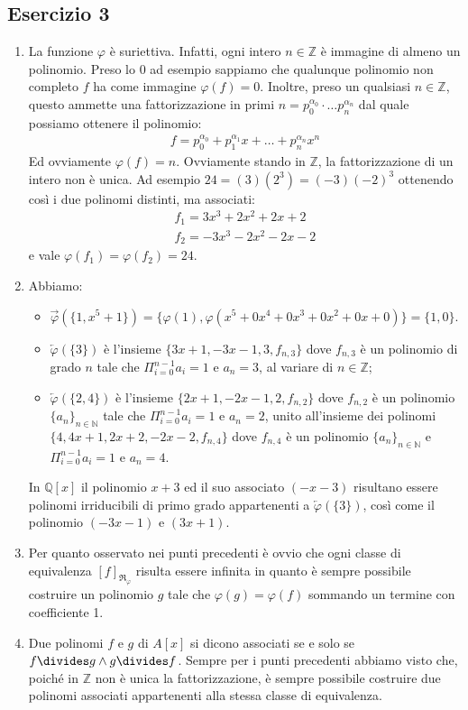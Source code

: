 \subsection*{Esercizio 3}
\begin{enumerate}[label=(\textit{\roman*})]
	\item La funzione $\varphi$ è suriettiva. Infatti, ogni intero $n \in \mathbb{Z}$ è immagine di almeno un polinomio. Preso lo $0$ ad esempio sappiamo che qualunque polinomio non completo $f$ ha come immagine $\varphi(f) = 0$. Inoltre, preso un qualsiasi $n \in \mathbb{Z}$, questo ammette una fattorizzazione in primi $n = p_{0}^{\alpha_{0}} \cdot \ldots p_{n}^{\alpha_{n}}$ dal quale possiamo ottenere il polinomio:
	\begin{align*}
		f =p_{0}^{\alpha_{0}} + p_{1}^{\alpha_{1}}x + \ldots + p_{n}^{\alpha_{n}}x^{n}
	\end{align*}
	Ed ovviamente  $\varphi(f)=n$. Ovviamente stando in $\mathbb{Z}$, la fattorizzazione di un intero non è unica. Ad esempio $24 = (3)(2^{3}) = (-3)(-2)^{3}$ ottenendo così i due polinomi distinti, ma associati:
	\begin{align*}
		f_{1}=3x^{3}+2x^{2}+2x+2\\
		f_{2}=-3x^{3}-2x^{2}-2x-2
	\end{align*}
e vale $\varphi(f_{1})=\varphi(f_{2})=24$.
	\item Abbiamo:
	\begin{itemize}
		\item $\overrightarrow{\varphi}(\{1,x^{5}+1\})=\{\varphi(1),\varphi(x^{5}+0x^{4}+0x^{3}+0x^{2}+0x+0)\}=\{1,0\}$.
		\item $\overleftarrow{\varphi}(\{3\})$ è l'insieme $\{3x+1,-3x-1,3,f_{n,3}\}$ dove $f_{n,3}$ è un polinomio di grado $n$ tale che $\Pi_{i=0}^{n-1} a_{i}= 1$ e $a_{n}=3$, al variare di $n \in \mathbb{Z}$;
		\item $\overleftarrow{\varphi}(\{2,4\})$ è l'insieme $\{2x+1,-2x-1,2,f_{n,2}\}$ dove $f_{n,2}$ è un polinomio $\{a_{n}\}_{n \in \mathbb{N}}$ tale che $\Pi_{i=0}^{n-1} a_{i} = 1$ e $a_{n}=2$, unito all'insieme dei polinomi $\{4,4x+1,2x+2,-2x-2,f_{n,4}\}$ dove $f_{n,4}$ è un polinomio $\{a_{n}\}_{n \in \mathbb{N}}$ e $\Pi_{i=0}^{n-1} a_{i} = 1$ e $a_{n}=4$.
	\end{itemize}
	 In $\mathbb{Q}[x]$ il polinomio $x+3$ ed il suo associato $(-x-3)$ risultano essere polinomi irriducibili di primo grado appartenenti a $\overleftarrow{\varphi}(\{3\})$, così come il polinomio $(-3x-1)$ e $(3x+1)$.
	\item Per quanto osservato nei punti precedenti è ovvio che ogni classe di equivalenza $[f]_{\mathfrak{R}_{\varphi}}$ risulta essere infinita in quanto è sempre possibile costruire un polinomio $g$ tale che $\varphi(g)=\varphi(f)$ sommando un termine con coefficiente 1.
	\item Due polinomi $f$ e $g$ di $A[x]$ si dicono associati se e solo se $f \divides g \land g \divides f$. Sempre per i punti precedenti abbiamo visto che, poiché in $\mathbb{Z}$ non è unica la fattorizzazione, è sempre possibile costruire due polinomi associati appartenenti alla stessa classe di equivalenza.
\end{enumerate}
